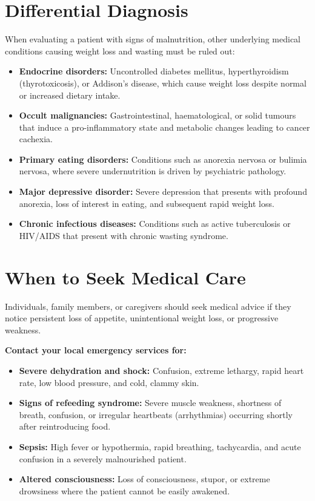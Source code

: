 \section*{Differential Diagnosis}
When evaluating a patient with signs of malnutrition, other underlying medical conditions causing weight loss and wasting must be ruled out:
\begin{itemize}
    \item \textbf{Endocrine disorders:} Uncontrolled diabetes mellitus, hyperthyroidism (thyrotoxicosis), or Addison's disease, which cause weight loss despite normal or increased dietary intake.
    \item \textbf{Occult malignancies:} Gastrointestinal, haematological, or solid tumours that induce a pro-inflammatory state and metabolic changes leading to cancer cachexia.
    \item \textbf{Primary eating disorders:} Conditions such as anorexia nervosa or bulimia nervosa, where severe undernutrition is driven by psychiatric pathology.
    \item \textbf{Major depressive disorder:} Severe depression that presents with profound anorexia, loss of interest in eating, and subsequent rapid weight loss.
    \item \textbf{Chronic infectious diseases:} Conditions such as active tuberculosis or HIV/AIDS that present with chronic wasting syndrome.
\end{itemize}

\section*{When to Seek Medical Care}
Individuals, family members, or caregivers should seek medical advice if they notice persistent loss of appetite, unintentional weight loss, or progressive weakness.

\textbf{Contact your local emergency services for:}
\begin{itemize}
    \item \textbf{Severe dehydration and shock:} Confusion, extreme lethargy, rapid heart rate, low blood pressure, and cold, clammy skin.
    \item \textbf{Signs of refeeding syndrome:} Severe muscle weakness, shortness of breath, confusion, or irregular heartbeats (arrhythmias) occurring shortly after reintroducing food.
    \item \textbf{Sepsis:} High fever or hypothermia, rapid breathing, tachycardia, and acute confusion in a severely malnourished patient.
    \item \textbf{Altered consciousness:} Loss of consciousness, stupor, or extreme drowsiness where the patient cannot be easily awakened.
\end{itemize}

